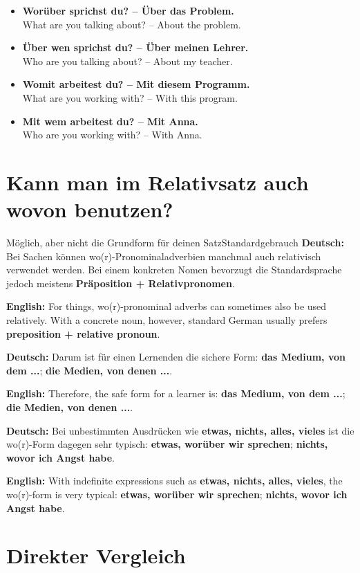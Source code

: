 \documentclass[a4paper,11pt]{article}
\newcommand{\GermanText}[1]{\textbf{Deutsch: }#1\par}
\newcommand{\EnglishText}[1]{{\small\color{SoftGray}\textbf{English: }#1\par}}
\newcommand{\ExampleItem}[2]{\item \textbf{#1}\\{\small\color{SoftGray}#2}}
\begin{document}
        \begin{exbox}
            \begin{itemize}
                \ExampleItem{Worüber sprichst du? -- Über das Problem.}{What are you talking about? -- About the problem.}
                \ExampleItem{Über wen sprichst du? -- Über meinen Lehrer.}{Who are you talking about? -- About my teacher.}
                \ExampleItem{Womit arbeitest du? -- Mit diesem Programm.}{What are you working with? -- With this program.}
                \ExampleItem{Mit wem arbeitest du? -- Mit Anna.}{Who are you working with? -- With Anna.}
            \end{itemize}
        \end{exbox}

    \section{Kann man im Relativsatz auch \glqq wovon\grqq{} benutzen?}

        \begin{grammarentry}{Möglich, aber nicht die Grundform für deinen Satz}{Standardgebrauch}
            \GermanText{Bei Sachen können wo(r)-Pronominaladverbien manchmal auch relativisch verwendet werden. Bei einem konkreten Nomen bevorzugt die Standardsprache jedoch meistens \textbf{Präposition + Relativpronomen}.}
            \EnglishText{For things, wo(r)-pronominal adverbs can sometimes also be used relatively. With a concrete noun, however, standard German usually prefers \textbf{preposition + relative pronoun}.}

            \GermanText{Darum ist für einen Lernenden die sichere Form: \textbf{das Medium, von dem ...}; \textbf{die Medien, von denen ...}.}
            \EnglishText{Therefore, the safe form for a learner is: \textbf{das Medium, von dem ...}; \textbf{die Medien, von denen ...}.}

            \GermanText{Bei unbestimmten Ausdrücken wie \textbf{etwas, nichts, alles, vieles} ist die wo(r)-Form dagegen sehr typisch: \textbf{etwas, worüber wir sprechen}; \textbf{nichts, wovor ich Angst habe}.}
            \EnglishText{With indefinite expressions such as \textbf{etwas, nichts, alles, vieles}, the wo(r)-form is very typical: \textbf{etwas, worüber wir sprechen}; \textbf{nichts, wovor ich Angst habe}.}
        \end{grammarentry}

    \section{Direkter Vergleich}
\end{document}
